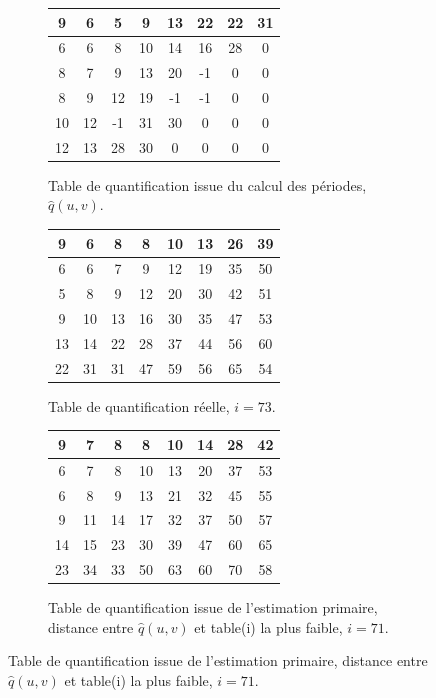 \documentclass[utf8,final]{stageM2R} %
\begin{document}
\begin{figure}
  \begin{subfigure}{.5\textwidth}
    \centering
    \begin{tabular}{|c|c|c|c|c|c|c|c|}
      \hline
      9 & 6 & 5 & 9 & 13 & 22 & 22 & 31 \\ \hline    
      6 & 6 & 8 & 10 & 14 & 16 & 28 & 0 \\ \hline
      8 & 7 & 9 & 13 & 20 & -1 & 0 & 0 \\ \hline
      8 & 9 & 12 & 19 & -1 & -1 & 0 & 0 \\ \hline
      10 & 12 & -1 & 31 & 30 & 0 & 0 & 0 \\ \hline
      12 & 13 & 28 & 30 & 0 & 0 & 0 & 0 \\ \hline
    \end{tabular}
    \caption{Table de quantification issue du calcul des périodes, $\widehat{q}(u,v)$.}
    \label{periods1}
  \end{subfigure}
  \begin{subfigure}{.5\textwidth}
    \centering
    \begin{tabular}{|c|c|c|c|c|c|c|c|}
      \hline
      9 & 6 & 8 & 8 & 10 & 13 & 26 & 39  \\ \hline
      6 & 6 & 7 & 9 & 12 & 19 & 35 & 50  \\ \hline
      5 & 8 & 9 & 12 & 20 & 30 & 42 & 51  \\ \hline
      9 & 10 & 13 & 16 & 30 & 35 & 47 & 53  \\ \hline
      13 & 14 & 22 & 28 & 37 & 44 & 56 & 60  \\ \hline
      22 & 31 & 31 & 47 & 59 & 56 & 65 & 54  \\ \hline
    \end{tabular}
    \caption{Table de quantification réelle, $i = 73$.}
    \label{periods3}
  \end{subfigure}
\vspace{5mm}

  \begin{subfigure}{.5\textwidth}
    \centering
    \begin{tabular}{|c|c|c|c|c|c|c|c|}
      \hline
      9 & 7 & 8 & 8 & 10 & 14 & 28 & 42 \\ \hline
      6 & 7 & 8 & 10 & 13 & 20 & 37 & 53 \\ \hline
      6 & 8 & 9 & 13 & 21 & 32 & 45 & 55 \\ \hline
      9 & 11 & 14 & 17 & 32 & 37 & 50 & 57 \\ \hline
      14 & 15 & 23 & 30 & 39 & 47 & 60 & 65 \\ \hline
      23 & 34 & 33 & 50 & 63 & 60 & 70 & 58 \\ \hline
    \end{tabular}
    \caption{Table de quantification issue de l'estimation primaire, distance entre $\widehat{q}(u,v)$ et table(i) la plus faible, $i = 71$.}
    \label{periods2}
  \end{subfigure}

\end{figure}
\end{document}
